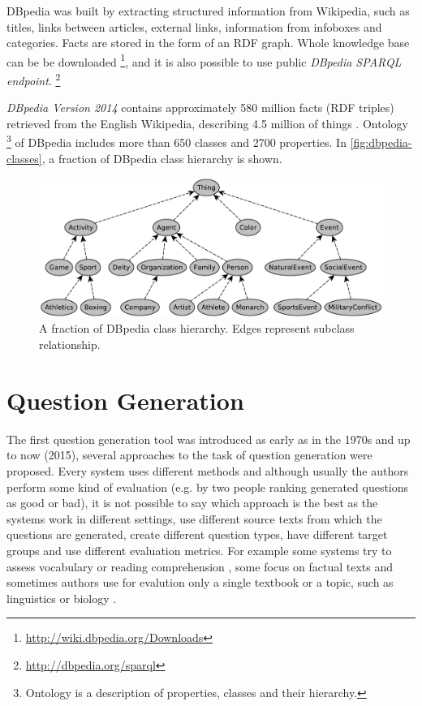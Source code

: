 \documentclass[12pt, twoside]{fithesis2}		%
\renewcommand{\_}{\leavevmode \kern0.07em\vbox{\hrule width0.4em}}
\begin{document}
DBpedia was built by extracting structured information from Wikipedia,
such as titles, links between articles, external links, information from infoboxes and categories.
Facts are stored in the form of an RDF graph.
Whole knowledge base can be be downloaded%
\footnote{\url{http://wiki.dbpedia.org/Downloads}}, %
and it is also possible to use public \textit{DBpedia SPARQL endpoint}.%
\footnote{\url{http://dbpedia.org/sparql}}

\emph{DBpedia Version 2014}
contains approximately 580 million facts (RDF triples) retrieved from the English Wikipedia,
describing 4.5 million of things \cite{dbpedia}.
Ontology%
\footnote{Ontology is a description of properties, classes and their hierarchy.}
of DBpedia includes more than 650 classes and 2700 properties.
In \autoref{fig:dbpedia-classes}, a fraction of DBpedia class hierarchy is shown.
\begin{figure}[h]
  \centering
  \includegraphics[width=\textwidth]{images/dbpedia-classes.pdf}
  \caption{A fraction of DBpedia class hierarchy. Edges represent subclass relationship.}
  \label{fig:dbpedia-classes}
\end{figure}


\chapter{Question Generation}
\label{chap:exercises}

The first question generation tool was introduced as early as in the 1970s \cite{questions-wolfe}
and up to now (2015), several approaches to the task of question generation were proposed.
Every system uses different methods and although usually the authors perform some kind of evaluation (e.g. by two people ranking generated questions as good or bad), it is not possible to say which approach is the best as the systems work in different settings, use different source texts from which the questions are generated, create different question types, have different target groups and use different evaluation metrics.
For example some systems try to assess vocabulary \cite{question-gen-vocabulary}
or reading comprehension \cite{question-overgenerating-rating},
some focus on factual texts \cite{question-gen-heilman}
and sometimes authors use for evalution only a single textbook or a topic, such as linguistics \cite{question-gen-mitkov} or biology \cite{question-gen-textbooks}.
\end{document}
